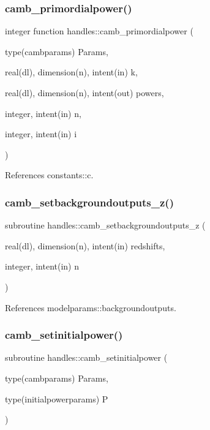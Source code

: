 \subsubsection{\texorpdfstring{camb\+\_\+primordialpower()}{camb\_primordialpower()}}
{\footnotesize\ttfamily integer function handles\+::camb\+\_\+primordialpower (\begin{DoxyParamCaption}\item[{type(cambparams)}]{Params,  }\item[{real(dl), dimension(n), intent(in)}]{k,  }\item[{real(dl), dimension(n), intent(out)}]{powers,  }\item[{integer, intent(in)}]{n,  }\item[{integer, intent(in)}]{i }\end{DoxyParamCaption})}



References constants\+::c.

\mbox{\label{namespacehandles_a4f9beee6e16e46b574ad807258bca56c}} 
\subsubsection{\texorpdfstring{camb\+\_\+setbackgroundoutputs\+\_\+z()}{camb\_setbackgroundoutputs\_z()}}
{\footnotesize\ttfamily subroutine handles\+::camb\+\_\+setbackgroundoutputs\+\_\+z (\begin{DoxyParamCaption}\item[{real(dl), dimension(n), intent(in)}]{redshifts,  }\item[{integer, intent(in)}]{n }\end{DoxyParamCaption})}



References modelparams\+::backgroundoutputs.

\mbox{\label{namespacehandles_a8cc3e1b0936fd89aca15f4cead25ad9c}} 
\subsubsection{\texorpdfstring{camb\+\_\+setinitialpower()}{camb\_setinitialpower()}}
{\footnotesize\ttfamily subroutine handles\+::camb\+\_\+setinitialpower (\begin{DoxyParamCaption}\item[{type(cambparams)}]{Params,  }\item[{type(initialpowerparams)}]{P }\end{DoxyParamCaption})}

